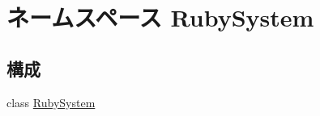 \hypertarget{namespaceRubySystem}{
\section{ネームスペース RubySystem}
\label{namespaceRubySystem}
}
\subsection*{構成}
\begin{DoxyCompactItemize}
\item 
class \hyperlink{classRubySystem_1_1RubySystem}{RubySystem}
\end{DoxyCompactItemize}
